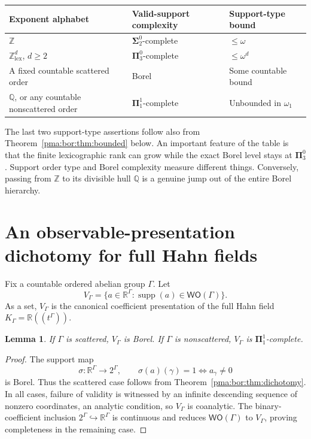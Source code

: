 \documentclass[11pt]{article}
\numberwithin{equation}{section}
\newtheorem{lemma}[lemma]{Lemma}
\theoremstyle{definition}
\theoremstyle{remark}
\newcommand{\Z}{\mathbb Z}
\newcommand{\Q}{\mathbb Q}
\newcommand{\R}{\mathbb R}
\newcommand{\supp}{\operatorname{supp}}
\newcommand{\WO}{\mathsf{WO}}
\begin{document}
\begin{center}
\renewcommand{\arraystretch}{1.25}
\begin{tabular}{@{}P{.36\textwidth}P{.27\textwidth}P{.25\textwidth}@{}}
\toprule
Exponent alphabet & Valid-support complexity & Support-type bound\\
\midrule
$\Z$ & $\boldsymbol\Sigma^0_2$-complete & $\leq\omega$\\
$\Z^d_{\mathrm{lex}}$, $d\geq2$ & $\boldsymbol\Pi^0_3$-complete & $\leq\omega^d$\\
A fixed countable scattered order & Borel & Some countable bound\\
$\Q$, or any countable nonscattered order & $\boldsymbol\Pi^1_1$-complete & Unbounded in $\omega_1$\\
\bottomrule
\end{tabular}
\end{center}

The last two support-type assertions follow also from
Theorem~\ref{pma:bor:thm:bounded} below. An important feature of the table is that the
finite lexicographic rank can grow while the exact Borel level stays at
$\boldsymbol\Pi^0_3$. Support order type and Borel complexity measure different
things. Conversely, passing from $\Z$ to its divisible hull $\Q$ is a genuine
jump out of the entire Borel hierarchy.

\section{An observable-presentation dichotomy for full Hahn fields}
\label{pma:bor:sec:field}

Fix a countable ordered abelian group $\Gamma$. Let
\[
 V_\Gamma=\{a\in\R^\Gamma:\supp(a)\in\WO(\Gamma)\}.
\]
As a set, $V_\Gamma$ is the canonical coefficient presentation of the full
Hahn field $K_\Gamma=\R((t^\Gamma))$.

\begin{lemma}
\label{pma:bor:lem:coefficientdomain}
If $\Gamma$ is scattered, $V_\Gamma$ is Borel. If $\Gamma$ is nonscattered,
$V_\Gamma$ is $\boldsymbol\Pi^1_1$-complete.
\end{lemma}
\begin{proof}
The support map
\[
 \sigma:\R^\Gamma\to2^\Gamma,\qquad
 \sigma(a)(\gamma)=1\Longleftrightarrow a_\gamma\ne0
\]
is Borel. Thus the scattered case follows from
Theorem~\ref{pma:bor:thm:dichotomy}. In all cases, failure of validity is witnessed
by an infinite descending sequence of nonzero coordinates, an analytic
condition, so $V_\Gamma$ is coanalytic. The binary-coefficient inclusion
$2^\Gamma\hookrightarrow\R^\Gamma$ is continuous and reduces
$\WO(\Gamma)$ to $V_\Gamma$, proving completeness in the remaining case.
\end{proof}
\end{document}

